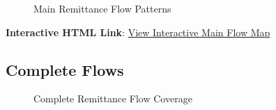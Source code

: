 \documentclass[
  11pt,
]{article}
\begin{document}
\begin{figure}[H]


\caption{\label{fig-main-flows}Main Remittance Flow Patterns}

\end{figure}%

\textbf{Interactive HTML Link}:
\href{https://github.com/WilliamClintC/RER/blob/main/_output/exported_figures/04_initial_flow_map_top50.html}{View
Interactive Main Flow Map}

\subsection{Complete Flows}\label{complete-flows}

\begin{figure}[H]


\caption{\label{fig-complete-flows}Complete Remittance Flow Coverage}

\end{figure}%
\end{document}
